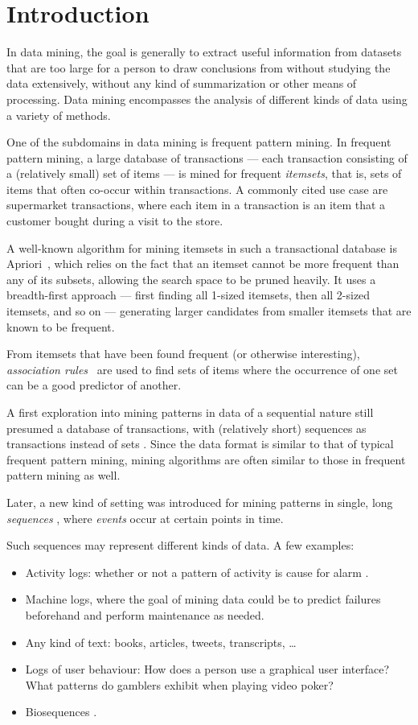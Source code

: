 \chapter{Introduction}

In data mining, the goal is generally to extract useful information from datasets that are too large for a person to draw conclusions from without studying the data extensively, without any kind of summarization or other means of processing. Data mining encompasses the analysis of different kinds of data using a variety of methods.

One of the subdomains in data mining is frequent pattern mining. In frequent pattern mining, a large database of transactions --- each transaction consisting of a (relatively small) set of items --- is mined for frequent \emph{itemsets}, that is, sets of items that often co-occur within transactions. A commonly cited use case are supermarket transactions, where each item in a transaction is an item that a customer bought during a visit to the store.

A well-known algorithm for mining itemsets in such a transactional database is Apriori~\citep{agrawal1994fast}, which relies on the fact that an itemset cannot be more frequent than any of its subsets, allowing the search space to be pruned heavily. It uses a breadth-first approach --- first finding all 1-sized itemsets, then all 2-sized itemsets, and so on --- generating larger candidates from smaller itemsets that are known to be frequent.

From itemsets that have been found frequent (or otherwise interesting), \emph{association rules}~\cite{agrawal1994fast} are used to find sets of items where the occurrence of one set can be a good predictor of another.

A first exploration into mining patterns in data of a sequential nature still presumed a database of transactions, with (relatively short) sequences as transactions instead of sets \citep{agrawal1995mining}.
Since the data format is similar to that of typical frequent pattern mining, mining algorithms are often similar to those in frequent pattern mining as well.

Later, a new kind of setting was introduced for mining patterns in single, long \emph{sequences} \citep{mannila1997discovery}, where \emph{events} occur at certain points in time.

Such sequences may represent different kinds of data. A few examples:
\begin{itemize}
\item Activity logs: whether or not a pattern of activity is cause for alarm \cite{mannila1997discovery}.
\item Machine logs, where the goal of mining data could be to predict failures beforehand and perform maintenance as needed.
\item Any kind of text: books, articles, tweets, transcripts, \ldots
\item Logs of user behaviour: How does a person use a graphical user interface? What patterns do gamblers exhibit when playing video poker?
\item Biosequences \cite{biosequences}.
\end{itemize}

